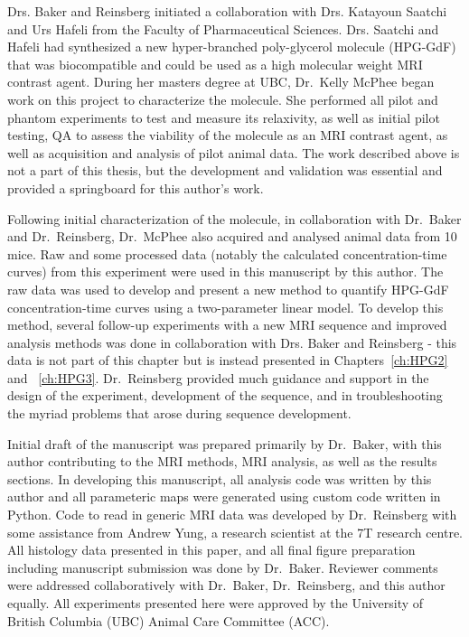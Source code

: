 Drs. Baker and Reinsberg initiated a collaboration with Drs. Katayoun Saatchi and Urs Hafeli from the Faculty of Pharmaceutical Sciences.
Drs. Saatchi and Hafeli had synthesized a new hyper-branched poly-glycerol molecule (\acs{HPG-GdF}) that was biocompatible and could be used as a high molecular weight MRI contrast agent.
During her masters degree at UBC, Dr.\ Kelly McPhee began work on this project to characterize the molecule. 
She performed all pilot and phantom experiments to test and measure its relaxivity, as well as initial pilot testing, QA to assess the viability of the molecule as an MRI contrast agent, as well as acquisition and analysis of pilot animal data.
The work described above is not a part of this thesis, but the development and validation was essential and provided a springboard for this author's work.

Following initial characterization of the molecule, in collaboration with Dr.\ Baker and Dr.\ Reinsberg, Dr.\ McPhee also acquired and analysed animal data from 10 mice. 
Raw and some processed data (notably the calculated concentration-time curves) from this experiment were used in this manuscript by this author.
The raw data was used to develop and present a new method to quantify \acs{HPG-GdF} concentration-time curves using a two-parameter linear model.
To develop this method, several follow-up experiments with a new MRI sequence and improved analysis methods was done in collaboration with Drs. Baker and Reinsberg - this data is not part of this chapter but is instead presented in Chapters~\ref{ch:HPG2} and ~\ref{ch:HPG3}.
Dr.\ Reinsberg provided much guidance and support in the design of the experiment, development of the sequence, and in troubleshooting the myriad problems that arose during sequence development.

Initial draft of the manuscript was prepared primarily by Dr.\ Baker, with this author contributing to the MRI methods, MRI analysis, as well as the results sections. 
In developing this manuscript, all analysis code was written by this author and all parameteric maps were generated using custom code written in Python.
Code to read in generic MRI data was developed by Dr.\ Reinsberg with some assistance from Andrew Yung, a research scientist at the 7T research centre.
All histology data presented in this paper, and all final figure preparation  including manuscript submission was done by Dr.\ Baker.
Reviewer comments were addressed collaboratively with Dr.\ Baker, Dr.\ Reinsberg, and this author equally.
All experiments presented here were approved by the University of British Columbia (UBC) Animal Care Committee (ACC).

